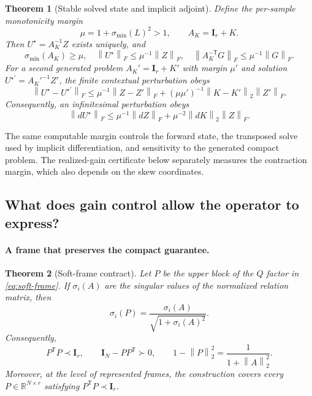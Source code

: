 \documentclass[10pt]{article}
\newtheorem{theorem}{Theorem}[section]
\newcommand{\R}{\mathbb{R}}
\newcommand{\I}{\mathbf{I}}
\newcommand{\T}{\mathsf{T}}
\newcommand{\norm}[1]{\left\lVert #1 \right\rVert}
\begin{document}
\begin{theorem}[Stable solved state and implicit adjoint]
\label{thm:stable-solve}
Define the per-sample monotonicity margin
\begin{equation}
    \mu=1+\sigma_{\min}(L)^2>1,
    \qquad A_K=\I_r+K.
\label{eq:monotonicity-margin}
\end{equation}
Then $U^\star=A_K^{-1}Z$ exists uniquely, and
\begin{equation}
    \sigma_{\min}(A_K)\geq\mu,
    \quad
    \norm{U^\star}_F\leq\mu^{-1}\norm{Z}_F,
    \quad
    \norm{A_K^{-\T}G}_F\leq\mu^{-1}\norm{G}_F.
\label{eq:solve-adjoint-bound}
\end{equation}
For a second generated problem $A_K'=\I_r+K'$ with margin $\mu'$ and solution
$U^{\star'}=A_K'^{-1}Z'$, the finite contextual perturbation obeys
\begin{equation}
    \norm{U^\star-U^{\star'}}_F
    \leq \mu^{-1}\norm{Z-Z'}_F
       +(\mu\mu')^{-1}\norm{K-K'}_2\norm{Z'}_F.
\label{eq:finite-solve-sensitivity}
\end{equation}
Consequently, an infinitesimal perturbation obeys
\begin{equation}
    \norm{dU^\star}_F
    \leq \mu^{-1}\norm{dZ}_F
       +\mu^{-2}\norm{dK}_2\norm{Z}_F.
\label{eq:solve-sensitivity}
\end{equation}
\end{theorem}

The same computable margin controls the forward state, the transposed solve
used by implicit differentiation, and sensitivity to the generated compact
problem.  The realized-gain certificate below separately measures the
contraction margin, which also depends on the skew coordinates.

\subsection{What does gain control allow the operator to express?}

\paragraph{A frame that preserves the compact guarantee.}

\begin{theorem}[Soft-frame contract]
\label{thm:soft-frame}
Let $P$ be the upper block of the $Q$ factor in
\eqref{eq:soft-frame}.  If $\sigma_i(A)$ are the singular values of the
normalized relation matrix, then
\begin{equation}
    \sigma_i(P)=\frac{\sigma_i(A)}
    {\sqrt{1+\sigma_i(A)^2}}.
\label{eq:soft-frame-spectrum}
\end{equation}
Consequently,
\begin{equation}
    P^\T P \prec \I_r,
    \qquad
    \I_N-PP^\T \succ 0,
    \qquad
    1-\norm{P}_2^2=\frac{1}{1+\norm{A}_2^2}.
\label{eq:soft-frame-contract}
\end{equation}
Moreover, at the level of represented frames, the construction covers every
$P\in\R^{N\times r}$ satisfying $P^\T P\prec\I_r$.
\end{theorem}
\end{document}
